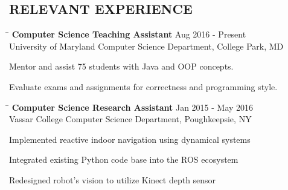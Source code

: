 \documentclass{res}
\begin{document}
\begin{resume}
{  \section{\hspace{0.3in}RELEVANT EXPERIENCE}
    \vspace{-3pt}
    \begin{tabbing}
      \hspace{5.65in}\=  \kill %
      {\bf Computer Science Teaching Assistant}
      \>Aug 2016 - Present\\
      University of Maryland Computer Science Department, College Park, MD\\     
    \end{tabbing}
    \vspace{-24pt}      %
    \begin{list}{\bf{-}}{}
      \setlength{\itemsep}{-2pt}
      \item Mentor and assist 75 students with Java and OOP concepts.
      \item Evaluate exams and assignments for correctness and programming style.
    \end{list}
    
    \vspace{-12pt}
    \begin{tabbing}
      \hspace{5.65in}\=  \kill %
      {\bf Computer Science Research Assistant}
      \>Jan 2015 - May 2016\\
      Vassar College Computer Science Department, Poughkeepsie, NY\\     
    \end{tabbing}
    \vspace{-24pt}      %
    \begin{list}{\bf{-}}{}
      \setlength{\itemsep}{-2pt}
      \item Implemented reactive indoor navigation using dynamical systems
      \item Integrated existing Python code base into the ROS ecosystem
      \item Redesigned robot's vision to utilize Kinect depth sensor
    \end{list}

}
\end{resume}
\end{document}
